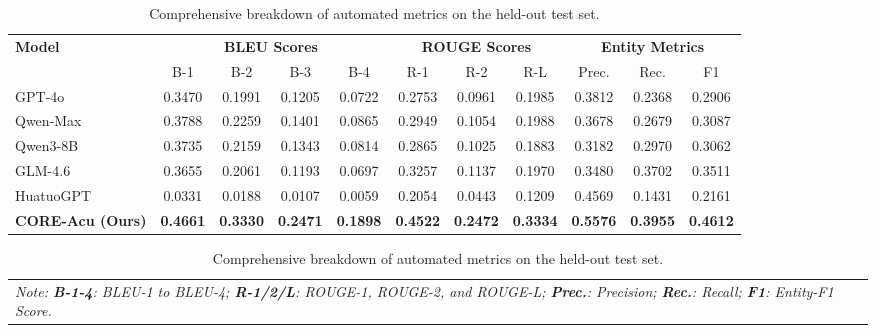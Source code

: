 \documentclass[preprint,5p,times,twocolumn,fleqn]{elsarticle}
\begin{document}
\begin{table}[!t]
  \centering
  \footnotesize
  \renewcommand{\arraystretch}{1.1}
  \setlength{\tabcolsep}{0pt}
  \caption{Comprehensive breakdown of automated metrics on the held-out test set.}
  \label{tab:merged_metrics}
  \begin{tabular*}{\textwidth}{@{\extracolsep{\fill}}l cccc ccc ccc @{}}
    \toprule
    \multirow{2}{*}{\textbf{Model}} & \multicolumn{4}{c}{\textbf{BLEU Scores}} & \multicolumn{3}{c}{\textbf{ROUGE Scores}} & \multicolumn{3}{c}{\textbf{Entity Metrics}} \\
    \cmidrule(lr){2-5} \cmidrule(lr){6-8} \cmidrule(lr){9-11}
     & B-1 & B-2 & B-3 & B-4 & R-1 & R-2 & R-L & Prec. & Rec. & F1 \\
    \midrule
    GPT-4o & 0.3470 & 0.1991 & 0.1205 & 0.0722 & 0.2753 & 0.0961 & 0.1985 & 0.3812 & 0.2368 & 0.2906 \\
    Qwen-Max & 0.3788 & 0.2259 & 0.1401 & 0.0865 & 0.2949 & 0.1054 & 0.1988 & 0.3678 & 0.2679 & 0.3087 \\
    Qwen3-8B & 0.3735 & 0.2159 & 0.1343 & 0.0814 & 0.2865 & 0.1025 & 0.1883 & 0.3182 & 0.2970 & 0.3062 \\
    GLM-4.6 & 0.3655 & 0.2061 & 0.1193 & 0.0697 & 0.3257 & 0.1137 & 0.1970 & 0.3480 & 0.3702 & 0.3511 \\
    HuatuoGPT  & 0.0331 & 0.0188 & 0.0107 & 0.0059 & 0.2054 & 0.0443 & 0.1209 & 0.4569 & 0.1431 & 0.2161 \\
    \textbf{CORE-Acu (Ours)} & \textbf{0.4661} & \textbf{0.3330} & \textbf{0.2471} & \textbf{0.1898} & \textbf{0.4522} & \textbf{0.2472} & \textbf{0.3334} & \textbf{0.5576} & \textbf{0.3955} & \textbf{0.4612} \\
    \bottomrule
  \end{tabular*}
  \begin{tabular*}{\textwidth}{@{}l@{}}
    \scriptsize \textit{Note: \textbf{B-1-4}: BLEU-1 to BLEU-4; \textbf{R-1/2/L}: ROUGE-1, ROUGE-2, and ROUGE-L; \textbf{Prec.}: Precision; \textbf{Rec.}: Recall; \textbf{F1}: Entity-F1 Score.}
  \end{tabular*}
\end{table}
\end{document}
